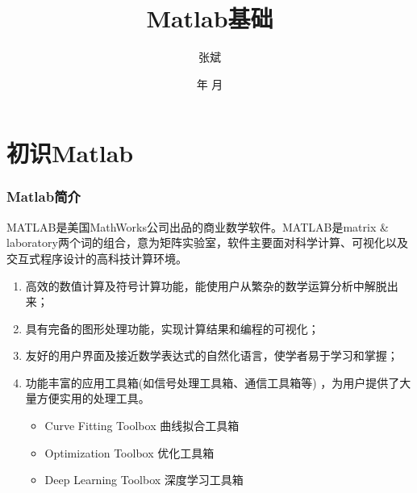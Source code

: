 \documentclass[dvipsnames, svgnames, x11names]{beamer}
\title{Matlab基础}
\author{张斌}
\institute[理工系]{河北农业大学 理工系}
\date{\the\year 年 \the\month 月}
\begin{document}
    
    \begin{frame}
        \titlepage
        \thispagestyle{empty}
    \end{frame}





\begin{frame}{}
    \begin{center}
        {\Huge {}}
    \end{center}
    \tableofcontents[subsectionstyle=hide/hide/show]
    \thispagestyle{empty}
\end{frame}


\section{初识Matlab}




\begin{frame}
    \frametitle{Matlab简介}
    MATLAB是美国MathWorks公司出品的商业数学软件。MATLAB是matrix \& laboratory两个词的组合，意为矩阵实验室，软件主要面对科学计算、可视化以及交互式程序设计的高科技计算环境。
    \begin{enumerate}
      \item 高效的数值计算及符号计算功能，能使用户从繁杂的数学运算分析中解脱出来；
      \item 具有完备的图形处理功能，实现计算结果和编程的可视化；
      \item 友好的用户界面及接近数学表达式的自然化语言，使学者易于学习和掌握；
      \item 功能丰富的应用工具箱(如信号处理工具箱、通信工具箱等) ，为用户提供了大量方便实用的处理工具。
        \begin{itemize}
            \item Curve Fitting Toolbox 曲线拟合工具箱
            \item Optimization Toolbox 优化工具箱
            \item Deep Learning Toolbox 深度学习工具箱
        \end{itemize}
    \end{enumerate}
\end{frame}
\end{document}
